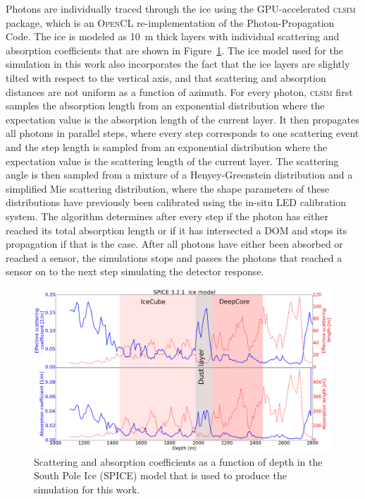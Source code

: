 Photons are individually traced through the ice using the GPU-accelerated \textsc{clsim}\cite{clsim} package, which is an \textsc{OpenCL} re-implementation of the Photon-Propagation Code.  The ice is modeled as 10~m thick layers with individual scattering and absorption coefficients that are shown in Figure~\ref{fig:spice-model}. The ice model used for the simulation in this work also incorporates the fact that the ice layers are slightly tilted with respect to the vertical axis, and that scattering and absorption distances are not uniform as a function of azimuth. For every photon, \textsc{clsim} first samples the absorption length from an exponential distribution where the expectation value is the absorption length of the current layer. It then propagates all photons in parallel steps, where every step corresponds to one scattering event and the step length is sampled from an exponential distribution where the expectation value is the scattering length of the current layer. The scattering angle is then sampled from a mixture of a Henyey-Greenstein distribution and a simplified Mie scattering distribution, where the shape parameters of these distributions have previously been calibrated using the in-situ LED calibration system. The algorithm determines after every step if the photon has either reached its total absorption length or if it has intersected a DOM and stops its propagation if that is the case. After all photons have either been absorbed or reached a sensor, the simulations stops and passes the photons that reached a sensor on to the next step simulating the detector response.

\begin{figure}
    \centering
    \includegraphics[width=0.9\linewidth]{figures/icecube/ice/Spice3.2.1_layered_scatt_abs_withlength_annotated.png}
    \caption{Scattering and absorption coefficients as a function of depth in the South Pole Ice (SPICE) model that is used to produce the simulation for this work.}
    \label{fig:spice-model}
\end{figure}


